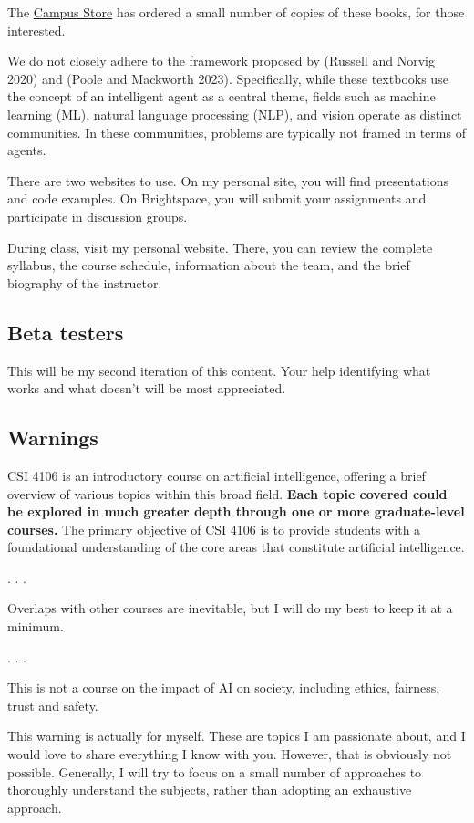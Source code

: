 \documentclass[
  letterpaper,
  DIV=11,
  numbers=noendperiod]{scrartcl}
\begin{document}
The \href{https://www.bkstr.com/ottawastore/home}{Campus Store} has
ordered a small number of copies of these books, for those interested.

We do not closely adhere to the framework proposed by (Russell and
Norvig 2020) and (Poole and Mackworth 2023). Specifically, while these
textbooks use the concept of an intelligent agent as a central theme,
fields such as machine learning (ML), natural language processing (NLP),
and vision operate as distinct communities. In these communities,
problems are typically not framed in terms of agents.

There are two websites to use. On my personal site, you will find
presentations and code examples. On Brightspace, you will submit your
assignments and participate in discussion groups.

During class, visit my personal website. There, you can review the
complete syllabus, the course schedule, information about the team, and
the brief biography of the instructor.

\subsection{Beta testers}\label{beta-testers}

This will be my second iteration of this content. Your help identifying
what works and what doesn't will be most appreciated.

\subsection{Warnings}\label{warnings}

CSI 4106 is an introductory course on artificial intelligence, offering
a brief overview of various topics within this broad field. \textbf{Each
topic covered could be explored in much greater depth through one or
more graduate-level courses.} The primary objective of CSI 4106 is to
provide students with a foundational understanding of the core areas
that constitute artificial intelligence.

. . .

Overlaps with other courses are inevitable, but I will do my best to
keep it at a minimum.

. . .

This is not a course on the impact of AI on society, including ethics,
fairness, trust and safety.

This warning is actually for myself. These are topics I am passionate
about, and I would love to share everything I know with you. However,
that is obviously not possible. Generally, I will try to focus on a
small number of approaches to thoroughly understand the subjects, rather
than adopting an exhaustive approach.
\end{document}
